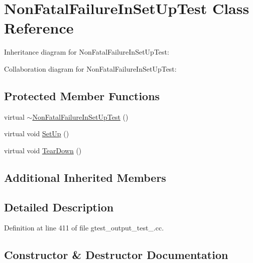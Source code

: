 \hypertarget{class_non_fatal_failure_in_set_up_test}{}\section{Non\+Fatal\+Failure\+In\+Set\+Up\+Test Class Reference}
\label{class_non_fatal_failure_in_set_up_test}


Inheritance diagram for Non\+Fatal\+Failure\+In\+Set\+Up\+Test\+:


Collaboration diagram for Non\+Fatal\+Failure\+In\+Set\+Up\+Test\+:
\subsection*{Protected Member Functions}
\begin{DoxyCompactItemize}
\item 
virtual \hyperlink{class_non_fatal_failure_in_set_up_test_ae4b4ee1812e3427cf82b155256547442}{$\sim$\+Non\+Fatal\+Failure\+In\+Set\+Up\+Test} ()
\item 
virtual void \hyperlink{class_non_fatal_failure_in_set_up_test_ae24c724bae1fcd2601f58fa9c26adca3}{Set\+Up} ()
\item 
virtual void \hyperlink{class_non_fatal_failure_in_set_up_test_a36abc808b11afc6a9bfa20dac5c28c30}{Tear\+Down} ()
\end{DoxyCompactItemize}
\subsection*{Additional Inherited Members}


\subsection{Detailed Description}


Definition at line 411 of file gtest\+\_\+output\+\_\+test\+\_\+.\+cc.



\subsection{Constructor \& Destructor Documentation}
